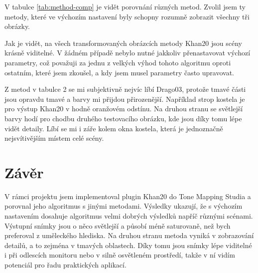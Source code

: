 \documentclass[11pt,a4paper,oneside]{article}
\begin{document}
V tabulce \ref{tab:method-comp} je vidět porovnání různých metod. Zvolil jsem ty
metody, které ve výchozím nastavení byly schopny rozumně zobrazit všechny tři
obrázky.

Jak je vidět, na všech transformovaných obrázcích metody Khan20 jsou scény krásně viditelné. V žádném případě
nebylo nutné jakkoliv přenastavovat výchozí parametry, což považuji za jednu z
velkých výhod tohoto algoritmu oproti ostatním, které jsem zkoušel, a kdy jsem musel
parametry často upravovat.

Z metod v tabulce 2 se mi subjektivně nejvíc líbí Drago03, protože tmavé části
jsou opravdu tmavé a barvy mi přijdou přirozenější. Například strop kostela je 
pro výstup Khan20 v hodně oranžovém odstínu. Na druhou stranu se světlejší barvy hodí pro chodbu
druhého testovacího obrázku, kde jsou díky tomu lépe vidět detaily. Líbí se mi i
záře kolem okna kostela, která je jednoznačně nejsvítivějším místem celé scény.

\section{Závěr}

V rámci projektu jsem implementoval plugin Khan20 do Tone Mapping Studia a
porovnal jeho algoritmus s jinými metodami. Výsledky ukazují, že s výchozím
nastavením dosahuje algoritmus velmi dobrých výsledků napříč různými scénami.
Výstupní snímky jsou o něco světlejší a působí méně saturovaně, než bych
preferoval z uměleckého hlediska. Na druhou stranu metoda vyniká v zobrazování detailů, a
to zejména v tmavých oblastech. Díky tomu jsou snímky lépe viditelné i při
odlescích monitoru nebo v silně osvětleném prostředí, takže v ní vidím
potenciál pro řadu praktických aplikací.



\end{document}
